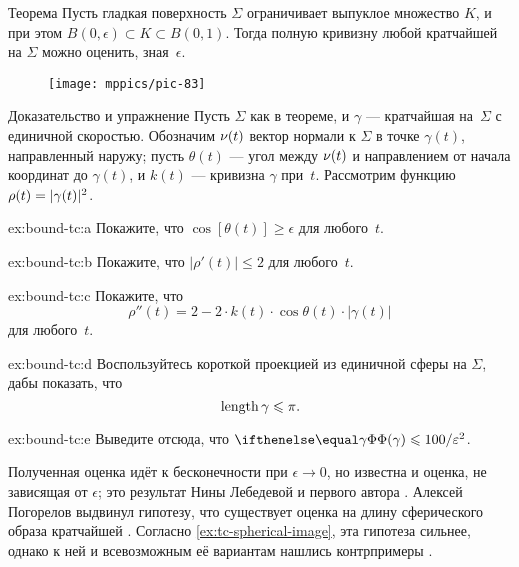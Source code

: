 \begin{thm}{Теорема}\label{thm:tc-of-mingeod}
Пусть гладкая поверхность $\Sigma$ ограничивает выпуклое множество $K$, и при этом $B(0,\epsilon)\subset K\subset B(0,1)$.
Тогда полную кривизну любой кратчайшей на $\Sigma$ можно оценить, зная~$\epsilon$.
\end{thm}

{

\begin{wrapfigure}{r}{48 mm}
\vskip4mm
\centering
\texttt{[image: mppics/pic-83]}
\vskip-0mm
\end{wrapfigure}

\begin{thm}{Доказательство и упражнение}\label{ex:bound-tc}
Пусть $\Sigma$ как в теореме, и $\gamma$ --- кратчайшая на~$\Sigma$ с единичной скоростью.
Обозначим $\nu(t)$ вектор нормали к $\Sigma$ в точке $\gamma(t)$, направленный наружу;
пусть $\theta(t)$ --- угол между $\nu(t)$ и направлением от начала координат до $\gamma(t)$,
и 
$k(t)$ --- кривизна $\gamma$ при~$t$.
Рассмотрим функцию $\rho(t)\z=|\gamma(t)|^2$.


\begin{subthm}{ex:bound-tc:a}
Покажите, что $\cos[\theta(t)]\ge \epsilon$ для любого~$t$.
\end{subthm}

\begin{subthm}{ex:bound-tc:b}
Покажите, что $|\rho'(t)|\le 2$ для любого~$t$.
\end{subthm}

\begin{subthm}{ex:bound-tc:c}
Покажите, что
\[\rho''(t)=2-2\cdot k(t)\cdot \cos \theta(t)\cdot |\gamma(t)|\]
для любого~$t$.
\end{subthm}

\begin{subthm}{ex:bound-tc:d}
Воспользуйтесь короткой проекцией из единичной сферы на $\Sigma$, дабы показать, что
\[\mathop{\rm length}\nolimits \gamma\leqslant \pi.\]
\end{subthm}

\begin{subthm}{ex:bound-tc:e}
Выведите отсюда, что $\tc\gamma\le 100/\epsilon^2$.
\end{subthm}

\end{thm}

}

Полученная оценка идёт к бесконечности при $\epsilon\to 0$,
но известна и оценка, не зависящая от $\epsilon$;
это результат Нины Лебедевой и первого автора \cite{lebedeva-petrunin}.
Алексей Погорелов выдвинул гипотезу, что существует оценка на длину сферического образа кратчайшей \cite{pogorelov}.
Согласно \ref{ex:tc-spherical-image}, эта гипотеза сильнее,
однако к ней и всевозможным её вариантам  нашлись контрпримеры \cite{zalgaller,milka,usov,pach}.
